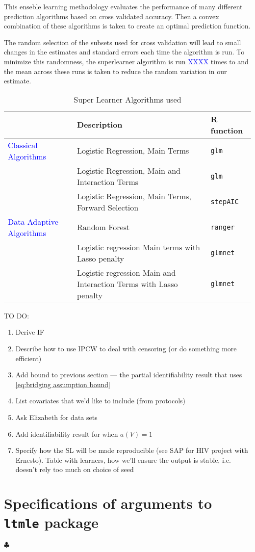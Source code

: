 \documentclass[12pt]{article}
\theoremstyle{definition}
\begin{document}
This enseble learning methodology evaluates the performance of many different prediction algorithms based on cross validated accuracy.  Then a convex combination of these algorithms is taken to create an optimal prediction function.  

The random selection of the subsets used for cross validation will lead to small changes in the estimates and standard errors each time the algorithm is run.  To minimize this randomness, the superlearner algorithm is run \textcolor{blue}{XXXX} times to and the mean across these runs is taken to reduce the random variation in our estimate.

\begin{table}
    \caption{Super Learner Algorithms used}
\centering
    \label{tab:SL_library}
    \begin{tabular}{lm{9.5cm}l}
        \toprule
       & Description & R function \\
       \midrule
\textcolor{blue}{Classical Algorithms} & Logistic Regression, Main Terms & \texttt{glm}\\
& Logistic Regression, Main and Interaction Terms & \texttt{glm}\\
& Logistic Regression, Main Terms, Forward Selection & \texttt{stepAIC}\\
\addlinespace
\textcolor{blue}{Data Adaptive Algorithms} & Random Forest & \texttt{ranger}\\
& Logistic regression Main terms with Lasso penalty & \texttt{glmnet}\\
& Logistic regression Main and Interaction Terms with Lasso penalty & \texttt{glmnet}\\
\bottomrule
    \end{tabular}
\end{table}

TO DO:
\begin{enumerate}
    \item Derive IF
    \item Describe how to use IPCW to deal with censoring (or do something more efficient)
    \item \checkmark Add bound to previous section --- the partial identifiability result that uses \eqref{eq:bridging assumption bound}
    \item List covariates that we'd like to include (from protocols)
    \item \checkmark Ask Elizabeth for data sets
    \item \checkmark Add identifiability result for when $a(V)=1$
    \item \checkmark Specify how the SL will be made reproducible (see SAP for HIV project with Ernesto). Table with learners, how we'll ensure the output is stable, i.e. doesn't rely too much on choice of seed
\end{enumerate}

\newpage
\appendix
\section{Specifications of arguments to \texttt{ltmle} package}
$\clubsuit$
\end{document}
